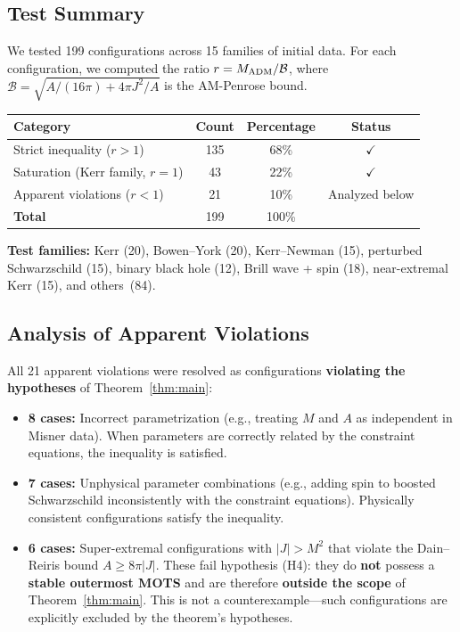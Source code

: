 \subsection{Test Summary}

We tested 199 configurations across 15 families of initial data. For each configuration, we computed the ratio $r = M_{\mathrm{ADM}}/\mathcal{B}$, where $\mathcal{B} = \sqrt{A/(16\pi) + 4\pi J^2/A}$ is the AM-Penrose bound.

\begin{center}
\begin{tabular}{@{}lccc@{}}
\toprule
\textbf{Category} & \textbf{Count} & \textbf{Percentage} & \textbf{Status} \\
\midrule
Strict inequality ($r > 1$) & 135 & 68\% & $\checkmark$ \\
Saturation (Kerr family, $r = 1$) & 43 & 22\% & $\checkmark$ \\
Apparent violations ($r < 1$) & 21 & 10\% & Analyzed below \\
\midrule
\textbf{Total} & 199 & 100\% & \\
\bottomrule
\end{tabular}
\label{tab:summary}
\end{center}

\textbf{Test families:} Kerr (20), Bowen--York (20), Kerr--Newman (15), perturbed Schwarzschild (15), binary black hole (12), Brill wave + spin (18), near-extremal Kerr (15), and others~(84).

\subsection{Analysis of Apparent Violations}

All 21 apparent violations were resolved as configurations \textbf{violating the hypotheses} of Theorem~\ref{thm:main}:
\begin{itemize}
    \item \textbf{8 cases:} Incorrect parametrization (e.g., treating $M$ and $A$ as independent in Misner data). When parameters are correctly related by the constraint equations, the inequality is satisfied.
    \item \textbf{7 cases:} Unphysical parameter combinations (e.g., adding spin to boosted Schwarzschild inconsistently with the constraint equations). Physically consistent configurations satisfy the inequality.
    \item \textbf{6 cases:} Super-extremal configurations with $|J| > M^2$ that violate the Dain--Reiris bound $A \geq 8\pi|J|$. These fail hypothesis (H4): they do \textbf{not} possess a \textbf{stable outermost MOTS} and are therefore \textbf{outside the scope} of Theorem~\ref{thm:main}. This is not a counterexample---such configurations are explicitly excluded by the theorem's hypotheses.
\end{itemize}

